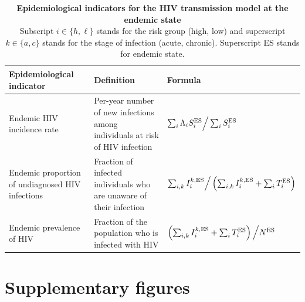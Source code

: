 \documentclass[12pt]{article}
\begin{document}
\begin{table}[H]
	\small
	\centering
	\caption[ Epidemiological indicators for the HIV transmission model at the endemic state]{%
	       	\textbf{Epidemiological indicators for the HIV transmission model at the endemic state}\\
	Subscript $i \in \{h,\ell\}$ stands for the risk group (high, low) and superscript $k \in \{a,c\}$ stands for the stage of infection (acute, chronic). Superscript ES stands for endemic state.}
	\begin{tabular}{p{} p{} p{}}
	\toprule
	\bf Epidemiological indicator & \bf Definition & \bf Formula\\
	\midrule
	Endemic HIV incidence rate & {Per-year} number of new infections among individuals at risk of HIV infection & $ \sum_i \Lambda_i S_i^{\rm ES} \Big/ \sum_i S_i^{\rm ES}$\\
	Endemic proportion of undiagnosed HIV infections & Fraction of infected individuals who are unaware of their infection & $\sum_{i,k}I_i^{k,\rm ES} \Big/ \left( \sum_{i,k}I_i^{k,\rm ES} + \sum_i T_i^{\rm ES}\right)$\\ 
	Endemic prevalence of HIV & Fraction of the population who is infected with HIV & $\left(\sum_{i,k}I_i^{k,\rm ES} + \sum_i T_i^{\rm ES}\right) \Big/ N^{\rm ES}$\\
	\bottomrule
	\end{tabular}
	\label{tab:EpiIndFormulas}
\end{table}

\vfill

\newpage
\section{Supplementary figures}
\end{document}
